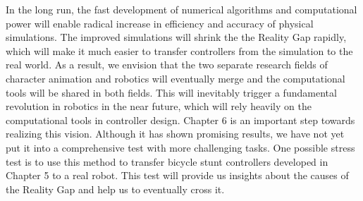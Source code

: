 In the long run, the fast development of numerical algorithms and computational power will enable radical increase in efficiency and accuracy of physical simulations. The improved simulations will shrink the the Reality Gap rapidly, which will make it much easier to transfer controllers from the simulation to the real world. As a result, we envision that the two separate research fields of character animation and robotics will eventually merge and the computational tools will be shared in both fields. This will inevitably trigger a fundamental revolution in robotics in the near future, which will rely heavily on the computational tools in controller design. Chapter 6 is an important step towards realizing this vision. Although it has shown promising results, we have not yet put it into a comprehensive test with more challenging tasks. One possible stress test is to use this method to transfer bicycle stunt controllers developed in Chapter 5 to a real robot. This test will provide us insights about the causes of the Reality Gap and help us to eventually cross it.



